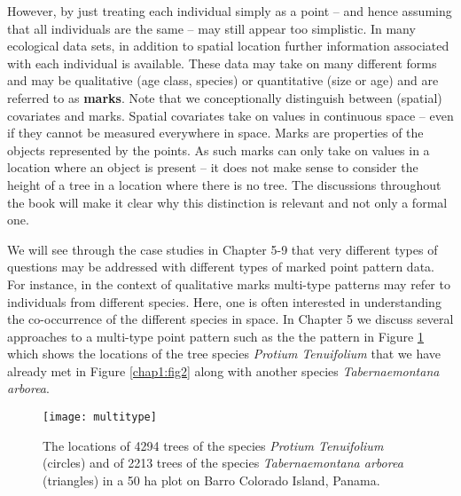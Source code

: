 However, by just treating each individual simply as a point -- and hence assuming that all individuals are the same -- may still appear too simplistic. In many ecological data sets, in addition to spatial location further information associated with each individual is available. These data may take on many different forms and may be qualitative (age class, species) or quantitative (size or age) and are referred to as \textbf{marks}.  Note that we conceptionally distinguish between (spatial) covariates and marks. Spatial covariates take on values in continuous space -- even if they cannot be measured everywhere in space. Marks are properties of the objects represented by the points. As such marks can only take on values in a location where an object is present -- it does not make sense to consider the height of a tree in a location where there is no tree. The discussions throughout the book will make it clear why this distinction is relevant and not only a formal one.

We will see through the case studies in Chapter 5-9 that very different types of questions may be addressed with different types of marked point pattern data. For instance, in the context of qualitative marks multi-type patterns may refer to individuals from different species. Here, one is often interested in understanding the co-occurrence of the different species  in space.  In Chapter 5 we discuss several approaches to a multi-type point pattern such as the the pattern in  Figure \ref{chap1:fig3} which shows the locations of the tree species \textit{Protium Tenuifolium} that we have already met in  Figure \ref{chap1:fig2} along with another species \textit{Tabernaemontana arborea}.
\begin{figure}[h]
\begin{center}
\texttt{[image: multitype]}
\end{center}
\caption{The locations of 4294 trees of the species \textit{Protium Tenuifolium} (circles) and of 2213 trees of the species \textit{Tabernaemontana arborea} (triangles) in a 50 ha plot on Barro Colorado Island, Panama.}
\label{chap1:fig3}
\end{figure}

